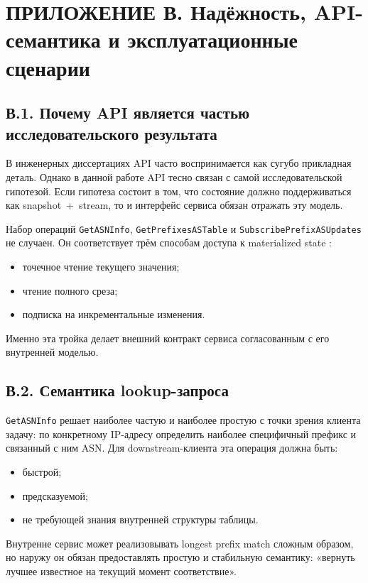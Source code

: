 \section*{ПРИЛОЖЕНИЕ В. Надёжность, API-семантика и эксплуатационные сценарии}

\subsection*{В.1. Почему API является частью исследовательского результата}

В инженерных диссертациях API часто воспринимается как сугубо
прикладная деталь. Однако в данной работе API тесно связан с самой
исследовательской гипотезой. Если гипотеза состоит в том, что
состояние должно поддерживаться как snapshot~+~stream, то и интерфейс
сервиса обязан отражать эту модель.

Набор операций \texttt{GetASNInfo}, \texttt{GetPrefixesASTable} и
\texttt{SubscribePrefixASUpdates} не случаен. Он соответствует трём
способам доступа к materialized state \cite{kleppmann2017ddia}:

\begin{itemize}
\item точечное чтение текущего значения;
\item чтение полного среза;
\item подписка на инкрементальные изменения.
\end{itemize}

Именно эта тройка делает внешний контракт сервиса согласованным с его
внутренней моделью.

\subsection*{В.2. Семантика lookup-запроса}

\texttt{GetASNInfo} решает наиболее частую и наиболее простую с точки
зрения клиента задачу: по конкретному IP-адресу определить наиболее
специфичный префикс и связанный с ним ASN. Для downstream-клиента эта
операция должна быть:

\begin{itemize}
\item быстрой;
\item предсказуемой;
\item не требующей знания внутренней структуры таблицы.
\end{itemize}

Внутренне сервис может реализовывать longest prefix match сложным
образом, но наружу он обязан предоставлять простую и стабильную
семантику: «вернуть лучшее известное на текущий момент соответствие».

